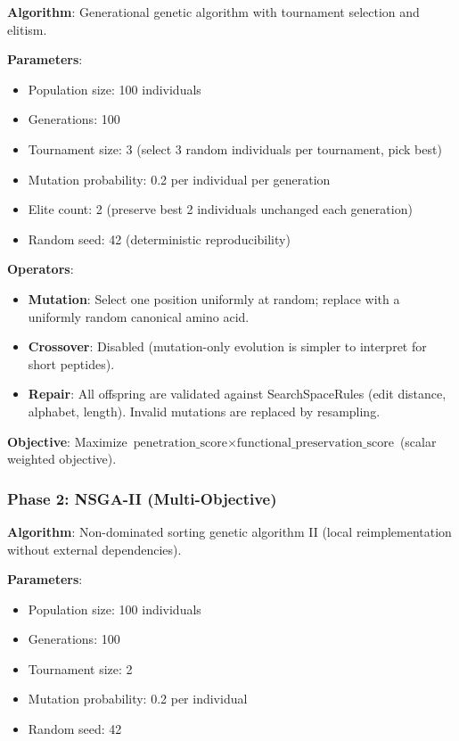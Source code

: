 \documentclass[11pt,a4paper]{article}
\begin{document}
\textbf{Algorithm}: Generational genetic algorithm with tournament selection and elitism.

\textbf{Parameters}:
\begin{itemize}
  \item Population size: 100 individuals
  \item Generations: 100
  \item Tournament size: 3 (select 3 random individuals per tournament, pick best)
  \item Mutation probability: 0.2 per individual per generation
  \item Elite count: 2 (preserve best 2 individuals unchanged each generation)
  \item Random seed: 42 (deterministic reproducibility)
\end{itemize}

\textbf{Operators}:
\begin{itemize}
  \item \textbf{Mutation}: Select one position uniformly at random; replace with a uniformly random canonical amino acid.
  \item \textbf{Crossover}: Disabled (mutation-only evolution is simpler to interpret for short peptides).
  \item \textbf{Repair}: All offspring are validated against SearchSpaceRules (edit distance, alphabet, length). Invalid mutations are replaced by resampling.
\end{itemize}

\textbf{Objective}: Maximize $\text{penetration\_score} \times \text{functional\_preservation\_score}$ (scalar weighted objective).

\subsubsection{Phase 2: NSGA-II (Multi-Objective)}

\textbf{Algorithm}: Non-dominated sorting genetic algorithm II (local reimplementation without external dependencies).

\textbf{Parameters}:
\begin{itemize}
  \item Population size: 100 individuals
  \item Generations: 100
  \item Tournament size: 2
  \item Mutation probability: 0.2 per individual
  \item Random seed: 42
\end{itemize}
\end{document}
